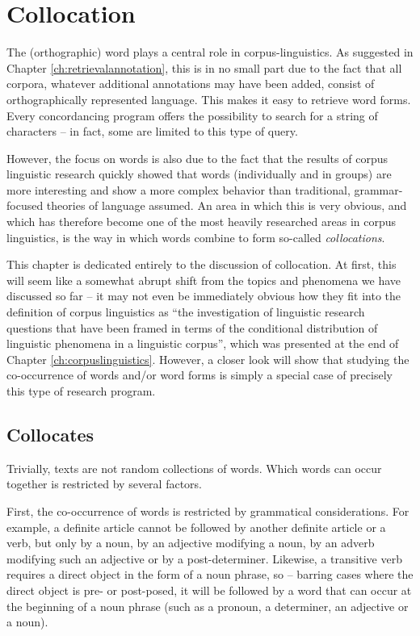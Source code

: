 \chapter{Collocation}
\label{ch:collocation}

The (orthographic) word plays a central role in corpus-linguistics. As suggested in Chapter \ref{ch:retrievalannotation}, this is in no small part due to the fact that all corpora, whatever additional annotations may have been added, consist of orthographically represented language. This makes it easy to retrieve word forms. Every concordancing program offers the possibility to search for a string of characters -- in fact, some are limited to this type of query.

However, the focus on words is also due to the fact that the results of corpus linguistic research quickly showed that words (individually and in groups) are more interesting and show a more complex behavior than traditional, grammar-focused theories of language assumed. An area in which this is very obvious, and which has therefore become one of the most heavily researched areas in corpus linguistics, is the way in which words combine to form so-called \textit{collocations}. 

This chapter is dedicated entirely to the discussion of collocation. At first, this will seem like a somewhat abrupt shift from the topics and phenomena we have discussed so far -- it may not even be immediately obvious how they fit into the definition of corpus linguistics as ``the investigation of linguistic research questions that have been framed in terms of the conditional distribution of linguistic phenomena in a linguistic corpus'', which was presented at the end of Chapter \ref{ch:corpuslinguistics}. However, a closer look will show that studying the co-occurrence of words and/or word forms is simply a special case of precisely this type of research program.

\section{Collocates}
\label{sec:collocates}

Trivially, texts are not random collections of words. Which words can occur together is restricted by several factors. 

First, the co-occurrence of words is restricted by grammatical considerations. For example, a definite article cannot be followed by another definite article or a verb, but only by a noun, by an adjective modifying a noun, by an adverb modifying such an adjective or by a post-determiner. Likewise, a transitive verb requires a direct object in the form of a noun phrase, so -- barring cases where the direct object is pre- or post-posed, it will be followed by a word that can occur at the beginning of a noun phrase (such as a pronoun, a determiner, an adjective or a noun).

